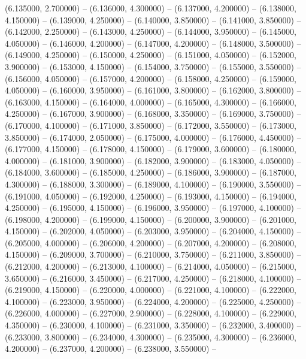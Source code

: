 (6.135000, 2.700000) -- 
(6.136000, 4.300000) -- 
(6.137000, 4.200000) -- 
(6.138000, 4.150000) -- 
(6.139000, 4.250000) -- 
(6.140000, 3.850000) -- 
(6.141000, 3.850000) -- 
(6.142000, 2.250000) -- 
(6.143000, 4.250000) -- 
(6.144000, 3.950000) -- 
(6.145000, 4.050000) -- 
(6.146000, 4.200000) -- 
(6.147000, 4.200000) -- 
(6.148000, 3.500000) -- 
(6.149000, 4.250000) -- 
(6.150000, 4.250000) -- 
(6.151000, 4.050000) -- 
(6.152000, 3.900000) -- 
(6.153000, 4.150000) -- 
(6.154000, 3.750000) -- 
(6.155000, 3.550000) -- 
(6.156000, 4.050000) -- 
(6.157000, 4.200000) -- 
(6.158000, 4.250000) -- 
(6.159000, 4.050000) -- 
(6.160000, 3.950000) -- 
(6.161000, 3.800000) -- 
(6.162000, 3.800000) -- 
(6.163000, 4.150000) -- 
(6.164000, 4.000000) -- 
(6.165000, 4.300000) -- 
(6.166000, 4.250000) -- 
(6.167000, 3.900000) -- 
(6.168000, 3.350000) -- 
(6.169000, 3.750000) -- 
(6.170000, 4.100000) -- 
(6.171000, 3.850000) -- 
(6.172000, 3.550000) -- 
(6.173000, 3.850000) -- 
(6.174000, 2.050000) -- 
(6.175000, 4.000000) -- 
(6.176000, 4.450000) -- 
(6.177000, 4.150000) -- 
(6.178000, 4.150000) -- 
(6.179000, 3.600000) -- 
(6.180000, 4.000000) -- 
(6.181000, 3.900000) -- 
(6.182000, 3.900000) -- 
(6.183000, 4.050000) -- 
(6.184000, 3.600000) -- 
(6.185000, 4.250000) -- 
(6.186000, 3.900000) -- 
(6.187000, 4.300000) -- 
(6.188000, 3.300000) -- 
(6.189000, 4.100000) -- 
(6.190000, 3.550000) -- 
(6.191000, 4.050000) -- 
(6.192000, 4.250000) -- 
(6.193000, 4.150000) -- 
(6.194000, 4.250000) -- 
(6.195000, 4.150000) -- 
(6.196000, 3.950000) -- 
(6.197000, 4.100000) -- 
(6.198000, 4.200000) -- 
(6.199000, 4.150000) -- 
(6.200000, 3.900000) -- 
(6.201000, 4.150000) -- 
(6.202000, 4.050000) -- 
(6.203000, 3.950000) -- 
(6.204000, 4.150000) -- 
(6.205000, 4.000000) -- 
(6.206000, 4.200000) -- 
(6.207000, 4.200000) -- 
(6.208000, 4.150000) -- 
(6.209000, 3.700000) -- 
(6.210000, 3.750000) -- 
(6.211000, 3.850000) -- 
(6.212000, 4.200000) -- 
(6.213000, 4.100000) -- 
(6.214000, 4.050000) -- 
(6.215000, 3.650000) -- 
(6.216000, 3.450000) -- 
(6.217000, 4.250000) -- 
(6.218000, 4.100000) -- 
(6.219000, 4.150000) -- 
(6.220000, 4.000000) -- 
(6.221000, 4.100000) -- 
(6.222000, 4.100000) -- 
(6.223000, 3.950000) -- 
(6.224000, 4.200000) -- 
(6.225000, 4.250000) -- 
(6.226000, 4.000000) -- 
(6.227000, 2.900000) -- 
(6.228000, 4.100000) -- 
(6.229000, 4.350000) -- 
(6.230000, 4.100000) -- 
(6.231000, 3.350000) -- 
(6.232000, 3.400000) -- 
(6.233000, 3.800000) -- 
(6.234000, 4.300000) -- 
(6.235000, 4.300000) -- 
(6.236000, 4.200000) -- 
(6.237000, 4.200000) -- 
(6.238000, 3.550000) -- 

